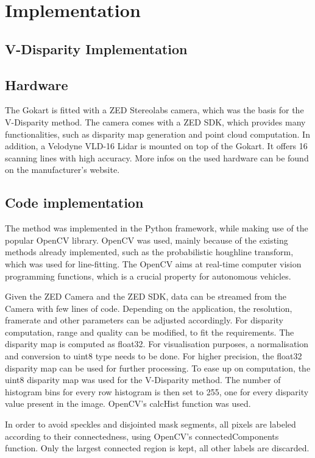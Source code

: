 
\chapter{Implementation}
\label{chp:Implementation}


\section{V-Disparity Implementation}
\label{vdisp_impl}


\section{Hardware}

The Gokart is fitted with a ZED Stereolabs camera, which was the basis for the V-Disparity method. The camera comes with a ZED SDK, which provides many functionalities, such as disparity map generation and point cloud computation.
In addition, a Velodyne VLD-16 Lidar is mounted on top of the Gokart. It offers 16 scanning lines with high accuracy.
More infos on the used hardware can be found on the manufacturer's website.

\section{Code implementation}

The method was implemented in the Python framework, while making use of the popular OpenCV library. OpenCV was used, mainly because of the existing methods already implemented, such as the probabilistic houghline transform, which was used for line-fitting. The OpenCV aims at real-time computer vision programming functions, which is a crucial property for autonomous vehicles.
\newline

Given the ZED Camera and the ZED SDK, data can be streamed from the Camera with few lines of code. Depending on the application, the resolution, framerate and other parameters can be adjusted accordingly. For disparity computation, range and quality can be modified, to fit the requirements.
The disparity map is computed as float32. For visualisation purposes, a normalisation and conversion to uint8 type needs to be done. 
For higher precision, the float32 disparity map can be used for further processing. 
To ease up on computation, the uint8 disparity map was used for the V-Disparity method. The number of histogram bins for every row histogram is then set to 255, one for every disparity value present in the image. OpenCV's calcHist function was used.


In order to avoid speckles and disjointed mask segments, all pixels are labeled according to their connectedness, using OpenCV's connectedComponents function. Only the largest connected region is kept, all other labels are discarded. 